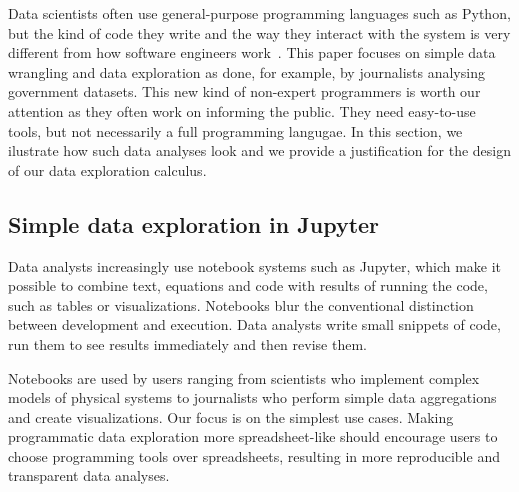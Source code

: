 \documentclass[english,crc,references=cleveref]{programming}
\theoremstyle{plain}
\theoremstyle{definition}
\begin{document}
Data scientists often use general-purpose programming languages such as Python, but the kind of
code they write and the way they interact with the system is very different from how software
engineers work~\cite{workflow}. This paper focuses on simple data wrangling and data exploration as
done, for example, by journalists analysing government datasets. This new kind of non-expert
programmers is worth our attention as they often work on informing the public. They need easy-to-use
tools, but not necessarily a full programming langugae. In this section, we ilustrate how such
data analyses look and we provide a justification for the design of our data exploration calculus.


\subsection{Simple data exploration in Jupyter}
\label{sec:background-jupyter}

Data analysts increasingly use notebook systems such as Jupyter, which make it possible to
combine text, equations and code with results of running the code, such as tables or visualizations.
Notebooks blur the conventional distinction between development and execution. Data analysts write
small snippets of code, run them to see results immediately and then revise them.

Notebooks are used by users ranging from scientists who implement complex models of physical
systems to journalists who perform simple data aggregations and create visualizations. Our
focus is on the simplest use cases. Making programmatic data exploration more
spreadsheet-like should encourage users to choose programming tools over spreadsheets, resulting
in more reproducible and transparent data analyses.
\end{document}
